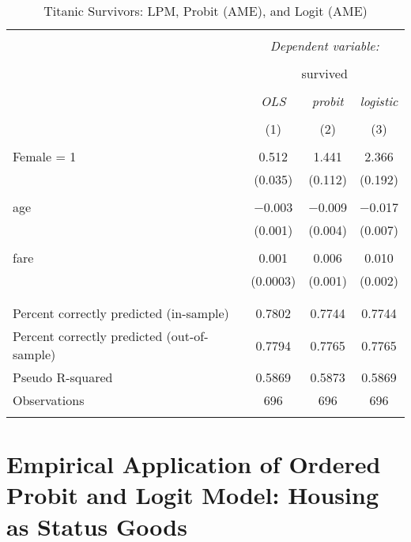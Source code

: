 \documentclass[
  12pt,
]{article}
\begin{document}
\begin{table}[t] \centering 
  \caption{Titanic Survivors: LPM, Probit (AME), and Logit (AME)} 
  \label{titanic} 
\begin{tabular}{@{\extracolsep{5pt}}lccc} 
\\[-1.8ex]\hline 
\hline \\[-1.8ex] 
 & \multicolumn{3}{c}{\textit{Dependent variable:}} \\ 
\cline{2-4} 
\\[-1.8ex] & \multicolumn{3}{c}{survived} \\ 
\\[-1.8ex] & \textit{OLS} & \textit{probit} & \textit{logistic} \\ 
\\[-1.8ex] & (1) & (2) & (3)\\ 
\hline \\[-1.8ex] 
 Female = 1 & 0.512 & 1.441 & 2.366 \\ 
  & (0.035) & (0.112) & (0.192) \\ 
  & & & \\ 
 age & $-$0.003 & $-$0.009 & $-$0.017 \\ 
  & (0.001) & (0.004) & (0.007) \\ 
  & & & \\ 
 fare & 0.001 & 0.006 & 0.010 \\ 
  & (0.0003) & (0.001) & (0.002) \\ 
  & & & \\ 
\hline \\[-1.8ex] 
Percent correctly predicted (in-sample) & 0.7802 & 0.7744 & 0.7744 \\ 
Percent correctly predicted (out-of-sample) & 0.7794 & 0.7765 & 0.7765 \\ 
Pseudo R-squared & 0.5869 & 0.5873 & 0.5869 \\ 
Observations & 696 & 696 & 696 \\ 
\hline 
\hline \\[-1.8ex] 
\end{tabular} 
\end{table}

\hypertarget{empirical-application-of-ordered-probit-and-logit-model-housing-as-status-goods}{%
\section{Empirical Application of Ordered Probit and Logit Model:
Housing as Status
Goods}\label{empirical-application-of-ordered-probit-and-logit-model-housing-as-status-goods}}
\end{document}
